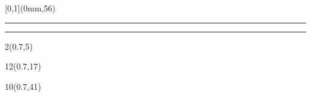 \begin{frame}[plain]
  \begin{textblock*}{\paperwidth}[0,1](0mm,56\TPVertModule)
    \textcolor{rouge}{\rule{\banderougewidth}{\banderougeheight}}%
    \textcolor{bleu}{\rule{\bandeorwidth}{\bandeorheight}}
  \end{textblock*}

  \begin{textblock*}{2\TPHorizModule}(0.7\TPHorizModule,5\TPVertModule)
    \textcolor[rgb]{0.13,0.13,0.13}{\webinaire}
  \end{textblock*}

  \begin{textblock*}{12\TPHorizModule}(0.7\TPHorizModule,17\TPVertModule)
    \textcolor[rgb]{0.13,0.13,0.13}{\titlefmt}
  \end{textblock*}

  \begin{textblock*}{10\TPHorizModule}(0.7\TPHorizModule,41\TPVertModule)
    \textcolor[rgb]{0.13,0.13,0.13}{\datefmt}
  \end{textblock*}
\end{frame}
\endgroup
